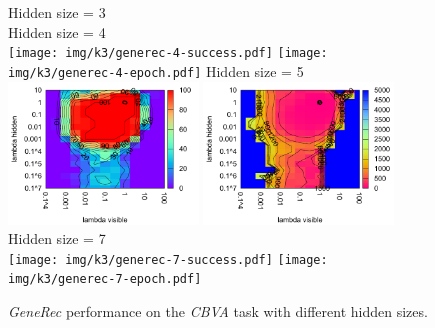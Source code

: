\begin{figure}[H]
  \centering
  Hidden size = 3 \\
  Hidden size = 4 \\
  \texttt{[image: img/k3/generec-4-success.pdf]} 
  \texttt{[image: img/k3/generec-4-epoch.pdf]}   
  Hidden size = 5 \\
  \includegraphics[width=0.45\textwidth]{img/k3/generec-5-success.pdf} 
  \includegraphics[width=0.45\textwidth]{img/k3/generec-5-epoch.pdf}  
  Hidden size = 7 \\
  \texttt{[image: img/k3/generec-7-success.pdf]} 
  \texttt{[image: img/k3/generec-7-epoch.pdf]}    
  \caption{\emph{GeneRec} performance on the \emph{CBVA} task with different hidden sizes.}
  \label{fig:results-generec-k3-success}
\end{figure}

